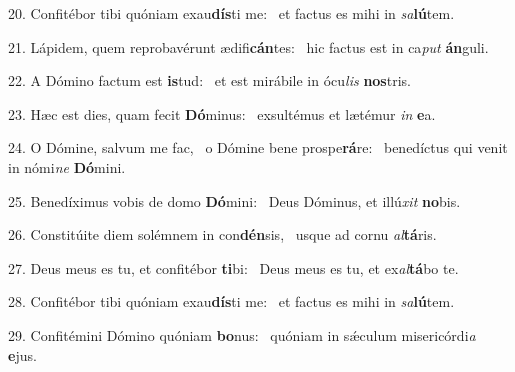 20. Confitébor tibi quóniam exau\textbf{dís}ti me: \ast\  et factus es mihi in \textit{sa}\textbf{lú}tem.\

21. Lápidem, quem reprobavérunt ædifi\textbf{cán}tes: \ast\  hic factus est in ca\textit{put} \textbf{án}guli.\

22. A Dómino factum est \textbf{is}tud: \ast\  et est mirábile in ócu\textit{lis} \textbf{nos}tris.\

23. Hæc est dies, quam fecit \textbf{Dó}minus: \ast\  exsultémus et lætémur \textit{in} \textbf{e}a.\

24. O Dómine, salvum me fac, \dag\  o Dómine bene prospe\textbf{rá}re: \ast\  benedíctus qui venit in nómi\textit{ne} \textbf{Dó}mini.\

25. Benedíximus vobis de domo \textbf{Dó}mini: \ast\  Deus Dóminus, et illú\textit{xit} \textbf{no}bis.\

26. Constitúite diem solémnem in con\textbf{dén}sis, \ast\  usque ad cornu \textit{al}\textbf{tá}ris.\

27. Deus meus es tu, et confitébor \textbf{ti}bi: \ast\  Deus meus es tu, et ex\textit{al}\textbf{tá}bo te.\

28. Confitébor tibi quóniam exau\textbf{dís}ti me: \ast\  et factus es mihi in \textit{sa}\textbf{lú}tem.\

29. Confitémini Dómino quóniam \textbf{bo}nus: \ast\  quóniam in sǽculum misericórdi\textit{a} \textbf{e}jus.\

